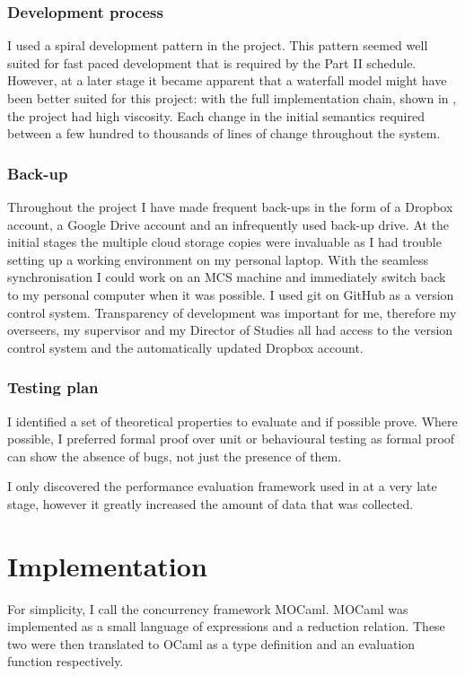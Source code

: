 \documentclass[12pt,twoside,notitlepage]{report}
\theoremstyle{plain}%
\theoremstyle{definition}
\theoremstyle{remark}
\begin{document}
\subsection{Development process}
I used a spiral development pattern in the project. This pattern seemed well suited for fast paced development that is required by the Part II schedule. However, at a later stage it became apparent that a waterfall model might have been better suited for this project: with the full implementation chain, shown in , the project had high viscosity. Each change in the initial semantics required between a few hundred to thousands of lines of change throughout the system. 
\subsection{Back-up}
Throughout the project I have made frequent back-ups in the form of a Dropbox account, a Google Drive account and an infrequently used back-up drive. At the initial stages the multiple cloud storage copies were invaluable as I had trouble setting up a working environment on my personal laptop. With the seamless synchronisation I could work on an MCS machine and immediately switch back to my personal computer when it was possible.  I used git on GitHub as a version control system. Transparency of development was important for me, therefore my overseers, my supervisor and my Director of Studies all had access to the version control system and the automatically updated Dropbox account.
\subsection{Testing plan}
I identified a set of theoretical properties to evaluate and if possible prove. Where possible, I preferred formal proof over unit or behavioural testing as formal proof can show the absence of bugs, not just the presence of them. 

I only discovered the performance evaluation framework used in  at a very late stage, however it greatly increased the amount of data that was collected.

\cleardoublepage
\chapter{Implementation}
For simplicity, I call the concurrency framework MOCaml. MOCaml was implemented as a small language of expressions and a reduction relation.  These two were then translated to OCaml as a type definition and an evaluation function respectively. 
\end{document}

